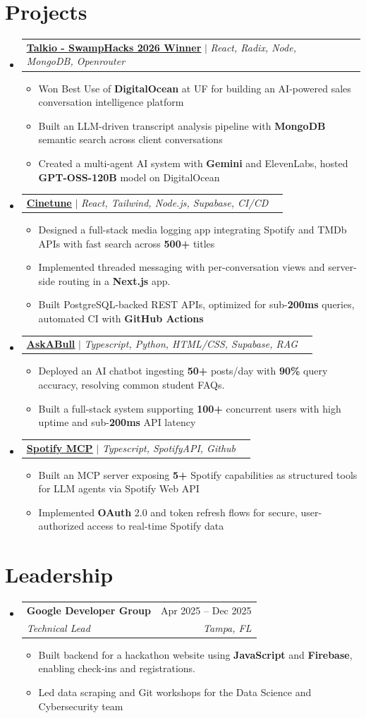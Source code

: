 \documentclass[letterpaper,11pt]{article}
\makeatletter
\newcommand{\resumeItem}[1]{
  \item\small{
    {#1 \vspace{-2pt}}
  }
}
\newcommand{\resumeSubheading}[4]{
  \vspace{-2pt}\item
    \begin{tabular*}{0.97\textwidth}[t]{l@{\extracolsep{\fill}}r}
      \textbf{#1} & #2 \\
      \textit{\small#3} & \textit{\small #4} \\
    \end{tabular*}\vspace{-7pt}
}
\newcommand{\resumeProjectHeading}[2]{
    \item
    \begin{tabular*}{0.97\textwidth}{l@{\extracolsep{\fill}}r}
      \small#1 & #2 \\
    \end{tabular*}\vspace{-7pt}
}
\newcommand{\resumeSubHeadingListStart}{\begin{itemize}[leftmargin=0.15in, label={}]}
\newcommand{\resumeSubHeadingListEnd}{\end{itemize}}
\newcommand{\resumeItemListStart}{\begin{itemize}}
\newcommand{\resumeItemListEnd}{\end{itemize}\vspace{-5pt}}
\makeatother
\begin{document}
\section{Projects}
    \resumeSubHeadingListStart
      \resumeProjectHeading
          {\textbf{\underline{\href{https://github.com/Ackberry/swamp-hacks}{Talkio - SwampHacks 2026 Winner}}} $|$ \emph{React, Radix, Node, MongoDB, Openrouter}}{}
          \resumeItemListStart
          \vspace{1.7pt}
            \resumeItem{Won Best Use of \textbf{DigitalOcean} at UF for building an AI-powered sales conversation intelligence platform}
            \resumeItem{Built an LLM-driven transcript analysis pipeline with \textbf{MongoDB} semantic search across client conversations}
            \resumeItem{Created a multi-agent AI system with \textbf{Gemini} and ElevenLabs,  hosted \textbf{GPT-OSS-120B} model on DigitalOcean}
          \resumeItemListEnd
      \resumeProjectHeading
          {\textbf{\underline{\href{https://github.com/Ackberry/cinetune}{Cinetune}}} $|$ \emph{React, Tailwind, Node.js, Supabase, CI/CD}}{}
          \resumeItemListStart
            \resumeItem{Designed a full-stack media logging app integrating Spotify and TMDb APIs with fast search across \textbf{500+} titles}
            \resumeItem{Implemented threaded messaging with per-conversation views and server-side routing in a \textbf{Next.js} app.}
            \resumeItem{Built PostgreSQL-backed REST APIs, optimized for sub-\textbf{200ms} queries, automated CI with \textbf{GitHub Actions}}
          \resumeItemListEnd
      \resumeProjectHeading
          {\textbf{\underline{\href{https://github.com/Ackberry/askabull}{AskABull}}} $|$ \emph{Typescript, Python, HTML/CSS, Supabase, RAG}}{}
          \resumeItemListStart
            \resumeItem{Deployed an AI chatbot ingesting \textbf{50+} posts/day with \textbf{90\%} query accuracy, resolving common student FAQs.}
            \resumeItem{Built a full-stack system supporting \textbf{100+} concurrent users with high uptime and sub-\textbf{200ms} API latency}
            \resumeItemListEnd
      \resumeProjectHeading
          {\textbf{\underline{\href{https://github.com/Ackberry/spotify_mcp}{Spotify MCP}}} $|$ \emph{Typescript, SpotifyAPI, Github}}{}
          \resumeItemListStart
            \resumeItem{Built an MCP server exposing \textbf{5+ }Spotify capabilities as structured tools for LLM agents via Spotify Web API}
            \resumeItem{Implemented \textbf{OAuth} 2.0 and token refresh flows for secure, user-authorized access to real-time Spotify data}
            \resumeItemListEnd
      
    \resumeSubHeadingListEnd


\section{Leadership}
\resumeSubHeadingListStart
  \resumeSubheading
    {Google Developer Group}{Apr 2025 -- Dec 2025}
    {Technical Lead}{Tampa, FL}
    \resumeItemListStart
      \resumeItem{Built backend for a hackathon website using \textbf{JavaScript} and \textbf{Firebase}, enabling check-ins and registrations.}
      \resumeItem{Led data scraping and Git workshops for the Data Science and Cybersecurity team}
    \resumeItemListEnd
\resumeSubHeadingListEnd  %
\end{document}
